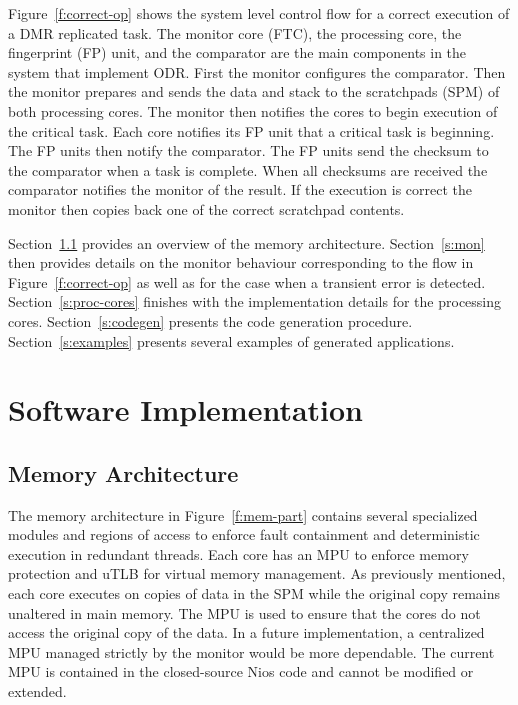 	Figure~\ref{f:correct-op} shows the system level control flow for a correct execution of a DMR replicated task.
	The monitor core (FTC), the processing core, the fingerprint (FP) unit, and the comparator are the main components in the system that implement ODR. 
	First the monitor configures the comparator. 
	Then the monitor prepares and sends the data and stack to the scratchpads (SPM) of both processing cores. 
	The monitor then notifies the cores to begin execution of the critical task. 
	Each core notifies its FP unit that a critical task is beginning. 
	The FP units then notify the comparator. 
	The FP units send the checksum to the comparator when a task is complete. 
	When all checksums are received the comparator notifies the monitor of the result. 
	If the execution is correct the monitor then copies back one of the correct scratchpad contents. 





	Section~\ref{s:mem-arch} provides an overview of the memory architecture. 
	Section~\ref{s:mon} then provides details on the monitor behaviour corresponding to the flow in Figure~\ref{f:correct-op} as well as for the case when a transient error is detected.
	Section~\ref{s:proc-cores} finishes with the implementation details for the processing cores.
	Section~\ref{s:codegen} presents the code generation procedure.
	Section~\ref{s:examples} presents several examples of generated applications.
	
\section{Software Implementation }
\subsection{Memory Architecture}
\label{s:mem-arch}
	The memory architecture in Figure~\ref{f:mem-part} contains several specialized modules and regions of access to enforce fault containment and deterministic execution in redundant threads. 
	Each core has an MPU to enforce memory protection and uTLB for virtual memory management. 
	As previously mentioned, each core executes on copies of data in the SPM while the original copy remains unaltered in main memory. 
	The MPU is used to ensure that the cores do not access the original copy of the data. 
	In a future implementation, a centralized MPU managed strictly by the monitor would be more dependable. 
	The current MPU is contained in the closed-source Nios code and cannot be modified or extended. 

